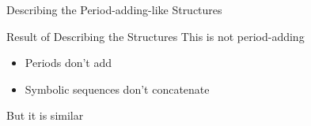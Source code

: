 \begin{frame}{Describing the Period-adding-like Structures}
	\vspace{-1em}
	\begin{figure}
	\end{figure}
\end{frame}

\begin{frame}{Result of Describing the Structures}
	This is not period-adding
	\begin{itemize}
		\item Periods don't add
		\item Symbolic sequences don't concatenate
	\end{itemize}
	\pause
	\vspace{1em}
	But it is similar
\end{frame}

